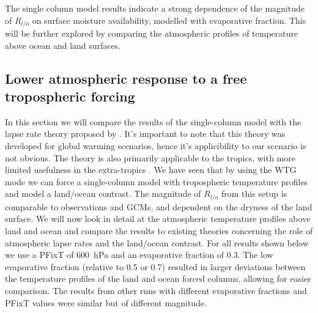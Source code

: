 The single column model results indicate a strong dependence of the magnitude of 
$R_{l/o}$ on surface moisture availability, modelled with evaporative fraction.  
This will be further explored by comparing the atmospheric profiles of 
temperature above ocean and land surfaces.


\subsection{Lower atmospheric response to a free tropospheric forcing}
\label{sec:scm_prof}

In this section we will compare the results of the single-column model with the 
lapse rate theory proposed by \citet{Byrne2013a}. It's important to note that 
this theory was developed for global warming scenarios, hence it's applicibility 
to our scenario is not obvious. The theory is also primarily applicable to the 
tropics, with more limited usefulness in the extra-tropics \citep{Byrne2013a}.  
We have seen that by using the WTG mode we can force a single-column model with 
tropospheric temperature profiles and model a land/ocean contrast.  The 
magnitude of $R_{l/o}$ from this setup is comparable to observations and GCMs, 
and dependent on the dryness of the land surface.  We will now look in detail at 
the atmospheric temperature profiles above land and ocean and compare the 
results to existing theories concerning the role of atmospheric lapse rates and 
the land/ocean contrast. For all results shown below we use a PFixT of 
\SI{600}{\hecto\pascal} and an evaporative fraction of 0.3.  The low evaporative 
fraction (relative to 0.5 or 0.7) resulted in larger deviations between the 
temperature profiles of the land and ocean forced columns, allowing for easier 
comparison. The results from other runs with different evaporative fractions and 
PFixT values were similar but of different magnitude.\\

